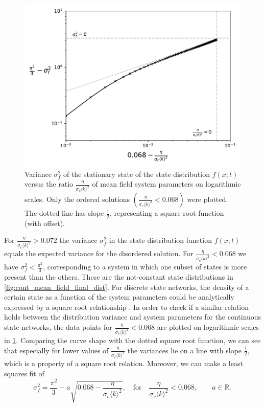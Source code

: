 \begin{figure}[tbp]
	\centering
	\includegraphics[width=0.7\linewidth]{figures/cont_mean_field_variance_loglog}
	\caption{Variance $\sigma_f^2$ of the stationary state of the state distribution $f(x;t)$ versus the ratio $\frac{\eta}{\sigma_c\langle k \rangle^2}$ of mean field system parameters on logarithmic scales. Only the ordered solutions $\left(\frac{\eta}{\sigma_c\langle k \rangle^2} < 0.068\right)$ were plotted. The dotted line has slope $\frac{1}{2}$, representing a square root function (with offset).}
	\label{fig:cont_mean_field_variance_loglog}
\end{figure}
\raggedbottom
For $\frac{\eta}{\sigma_c\langle k \rangle^2} > 0.072$ the variance $\sigma_f^2$ in the state distribution function $f(x;t)$ equals the expected variance for the disordered solution. For $\frac{\eta}{\sigma_c\langle k \rangle^2} < 0.068$ we have $\sigma_f^2 < \frac{\pi^2}{3}$, corresponding to a system in which one subset of states is more present than the others. These are the not-constant state distributions in \cref{fig:cont_mean_field_final_dist}. For discrete state networks, the density of a certain state as a function of the system parameters could be analytically expressed by a square root relationship \cite{Chen2016}. In order to check if a similar relation holds between the distribution variance and system parameters for the continuous state networks, the data points for $\frac{\eta}{\sigma_c\langle k \rangle^2} < 0.068$ are plotted on logarithmic scales in \cref{fig:cont_mean_field_variance_loglog}. Comparing the curve shape with the dotted square root function, we can see that especially for lower values of $\frac{\eta}{\sigma_c\langle k \rangle^2}$ the variances lie on a line with slope $\frac{1}{2}$, which is a property of a square root relation. Moreover, we can make a least squares fit of 
\begin{equation}
\sigma_f^2 = \frac{\pi^2}{3} - a \sqrt{0.068-\frac{\eta}{\sigma_c\langle k \rangle^2}}, \quad \text{for} \quad \frac{\eta}{\sigma_c\langle k \rangle^2} < 0.068, \qquad a \in \mathbb{R},
\end{equation}
